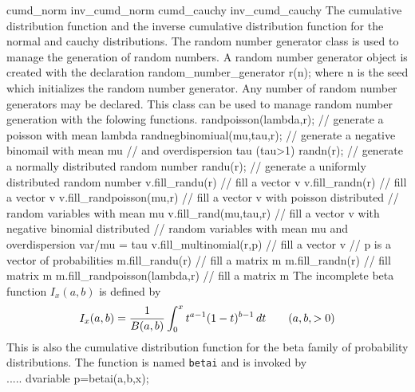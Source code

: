 \beginexamplea
cumd_norm
inv_cumd_norm
cumd_cauchy
inv_cumd_cauchy
\endexample
The cumulative distribution function and the inverse cumulative distribution 
function for the normal and cauchy distributions.
\label{rng}
The random number generator class is used to manage the generation of
random numbers. A random number generator object is created with the
declaration
\beginexamplea
random_number_generator r(n);
\endexample
where n is the seed which initializes the random number generator.
Any number of random number generators may be declared.
This class can be used to manage random number generation with the folowing functions.
\beginexamplea
randpoisson(lambda,r);  // generate a poisson with mean lambda
randnegbinomiual(mu,tau,r);  // generate a negative binomail with mean mu
                            // and overdispersion tau (tau>1)
randn(r);     // generate a normally distributed random number
randu(r);    // generate a uniformly distributed random number
v.fill_randu(r)  // fill a vector v
v.fill_randn(r)  // fill a vector v
v.fill_randpoisson(mu,r)  // fill a vector v with poisson distributed
                          // random variables with mean mu
v.fill_rand(mu,tau,r)  // fill a vector v with negative binomial distributed
            // random variables with mean mu and overdispersion var/mu = tau
v.fill_multinomial(r,p)  // fill a vector v 
                      // p is a vector of probabilities
m.fill_randu(r)  // fill a matrix m
m.fill_randn(r)  // fill matrix m
m.fill_randpoisson(lambda,r)  // fill a matrix m
\endexample
The incomplete beta function $I_x(a,b)$ is defined by
\begin{equation}
I_x(a,b)={\displaystyle 1\over \displaystyle B(a,b)}\int_0^x t^{a-1}(1-t)^{b-1}\,dt\qquad (a,b,>0)
\end{equation}
This is also the cumulative distribution function for the beta family
of probability distributions.
The function is named {\tt betai} and is invoked by
\beginexamplea
  \\ .....
 dvariable p=betai(a,b,x);
\endexample

